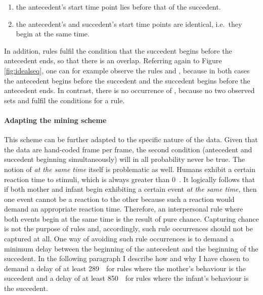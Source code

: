 \begin{enumerate}
	\item the antecedent's start time point lies before that of the succedent.
	\item the antecedent's and succedent's start time points are identical, i.e.\ they begin at the same time.
\end{enumerate}

In addition, rules fulfil the condition that the succedent begins before the antecedent ends, so that there is an overlap.
Referring again to Figure \ref{fig:idealseq}, one can for example observe the rules  and , because in both cases the antecedent begins before the succedent and the succedent begins before the antecedent ends.
In contrast, there is no occurrence of , because no two observed sets  and  fulfil the conditions for a rule.

\paragraph{Adapting the mining scheme}
This scheme can be further adapted to the specific nature of the data.
Given that the data are hand-coded frame per frame, the second condition (antecedent and succedent beginning simultaneously) will in all probability never be true.
The notion of \emph{at the same time} itself is problematic as well.
Humans exhibit a certain reaction time to stimuli, which is always greater than 0~\ms.
It logically follows that if both mother and infant begin exhibiting a certain event \emph{at the same time,} then one event cannot be a reaction to the other because such a reaction would demand an appropriate reaction time.
Therefore, an interpersonal rule where both events begin at the same time is the result of pure chance.
Capturing chance is not the purpose of rules and, accordingly, such rule occurrences should not be captured at all.
One way of avoiding such rule occurrences is to demand a minimum delay between the beginning of the antecedent and the beginning of the succedent.
In the following paragraph I describe how and why I have chosen to demand a delay of at least 289~\ms\ for rules where the mother's behaviour is the succedent and a delay of at least 850~\ms\  for rules where the infant's behaviour is the succedent.

